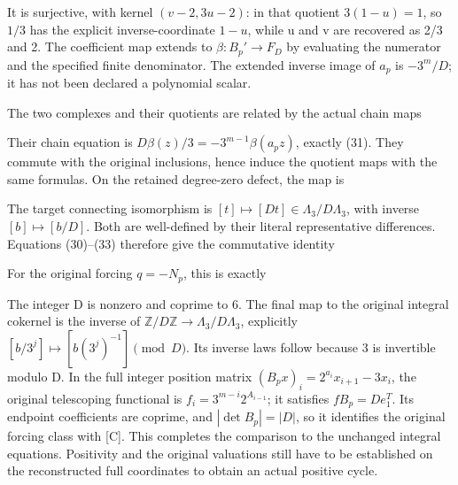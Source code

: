 It is surjective, with kernel \((v-2,3u-2)\): in that quotient
\(3(1-u)=1\), so \(1/3\) has the explicit inverse-coordinate \(1-u\),
while u and v are recovered as 2/3 and 2. The coefficient map extends to
\(\beta:B_p'\to F_D\) by evaluating the numerator and the specified
finite denominator. The extended inverse image of \(a_p\) is \(-3^m/D\);
it has not been declared a polynomial scalar.

The two complexes and their quotients are related by the actual chain
maps


Their chain equation is \(D\beta(z)/3=-3^{m-1}\beta(a_pz)\), exactly
(31). They commute with the original inclusions, hence induce the
quotient maps with the same formulas. On the retained degree-zero
defect, the map is


The target connecting isomorphism is
\([t]\mapsto[Dt]\in\Lambda_3/D\Lambda_3\), with inverse
\([b]\mapsto[b/D]\). Both are well-defined by their literal
representative differences. Equations (30)--(33) therefore give the
commutative identity


For the original forcing \(q=-N_p\), this is exactly


The integer D is nonzero and coprime to 6. The final map to the original
integral cokernel is the inverse of
\(\mathbb Z/D\mathbb Z\to\Lambda_3/D\Lambda_3\), explicitly
\([b/3^j]\mapsto[b(3^j)^{-1}]\pmod D\). Its inverse laws follow because
3 is invertible modulo D. In the full integer position matrix
\((B_px)_i=2^{a_i}x_{i+1}-3x_i\), the original telescoping functional is
\(f_i=3^{m-i}2^{A_{i-1}}\); it satisfies \(fB_p=D e_1^T\). Its endpoint
coefficients are coprime, and \(|\det B_p|=|D|\), so it identifies the
original forcing class with {[}C{]}. This completes the comparison to
the unchanged integral equations. Positivity and the original valuations
still have to be established on the reconstructed full coordinates to
obtain an actual positive cycle.

